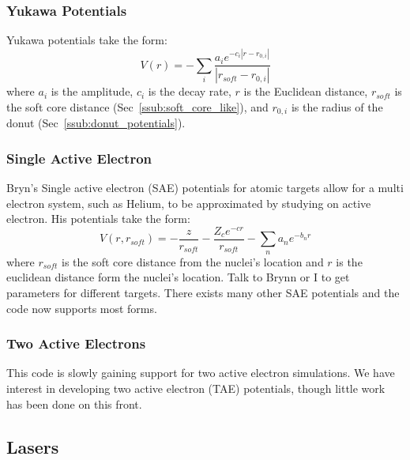 \documentclass{article}
\begin{document}
\subsubsection{Yukawa Potentials} %
\label{ssub:yukawa_potentials}
Yukawa potentials take the form:
\begin{equation}
  V(r) = - \sum\limits_i \frac{a_i e^{-c_i |r-r_{0,i}|}}{|r_{soft}-r_{0,i}|}
  \label{eq:yukawa}
\end{equation}
where $a_i$ is the amplitude, $c_i$ is the decay rate, $r$ is the Euclidean distance, $r_{soft}$ is the soft core distance (Sec~\ref{ssub:soft_core_like}), and $r_{0,i}$ is the radius of the donut (Sec~\ref{ssub:donut_potentials}).

\subsubsection{Single Active Electron} %
\label{ssub:single_active_electron}
Bryn's Single active electron (SAE) potentials for atomic targets allow for a multi electron system, such as Helium, to be approximated by studying on active electron. His potentials take the form:
\begin{equation}
  V(r, r_{soft}) = - \frac{z}{r_{soft}} - \frac{Z_c e^{-c r}}{r_{soft}} - \sum_n a_n e^{-b_n r}
    \label{eq:SAE}
\end{equation}
where $r_{soft}$ is the soft core distance from the nuclei's location and $r$ is the euclidean distance form the nuclei's location. Talk to Brynn or I to get parameters for different targets. There exists many other SAE potentials and the code now supports most forms.

\subsubsection{Two Active Electrons} %
\label{ssub:two_active_electrons}
This code is slowly gaining support for two active electron simulations. We have interest in developing two active electron (TAE) potentials, though little work has been done on this front.

\subsection{Lasers} %
\label{sub:lasers}
\end{document}
